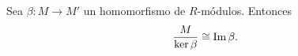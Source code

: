 %
\begin{teorema}
	 \label{teo:first-iso} Sea \(\beta : M \to M'\) un homomorfismo
	de \(R\)-módulos. Entonces
	\[
	\frac{M}{\ker \beta}\cong \operatorname{Im} \beta.
	\]
\end{teorema}
